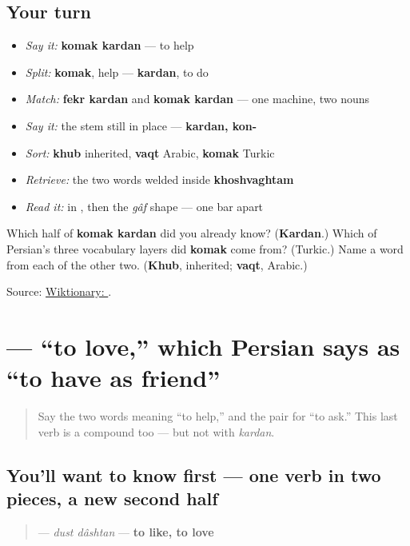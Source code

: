 \subsection*{Your turn}
\begin{itemize}
\raggedright
  \item \emph{Say it:} \textbf{komak kardan} — to help
  \item \emph{Split:} \textbf{komak}, help — \textbf{kardan}, to do
  \item \emph{Match:} \textbf{fekr kardan} and \textbf{komak kardan} — one machine, two nouns
  \item \emph{Say it:} the stem still in place — \textbf{kardan, kon-}
  \item \emph{Sort:} \textbf{khub} inherited, \textbf{vaqt} Arabic, \textbf{komak} Turkic
  \item \emph{Retrieve:} the two words welded inside \textbf{khoshvaghtam}
  \item \emph{Read it:} \textbf{} in \textbf{}, then the \emph{gâf} shape — one bar apart
\end{itemize}

\begin{tcolorbox}[breakable,colback=teal!4,colframe=teal!35!black,title={Before you move on}]
Which half of \textbf{komak kardan} did you already know? (\textbf{Kardan}.) Which of Persian's three vocabulary layers did \textbf{komak} come from? (Turkic.) Name a word from each of the other two. (\textbf{Khub}, inherited; \textbf{vaqt}, Arabic.)

Source: \href{https://en.wiktionary.org/wiki/\%DA\%A9\%D9\%85\%DA\%A9}{Wiktionary: }.
\end{tcolorbox}
\section[\texorpdfstring{\fa{دوست} \fa{داشتن} (dust dâshtan)}{دوست داشتن (dust dâshtan)}]{  — “to love,” which Persian says as “to have as friend”}

\label{lesson:FA-C08-dust-dashtan}



\begin{quote}
Say the two words meaning “to help,” and the pair for “to ask.” This last verb is a compound too — but not with \emph{kardan}.
\end{quote}

\subsection*{You'll want to know first — one verb in two pieces, a new second half}
\begin{quote}
\textbf{ } — \emph{dust dâshtan} — \textbf{to like, to love}
\end{quote}

